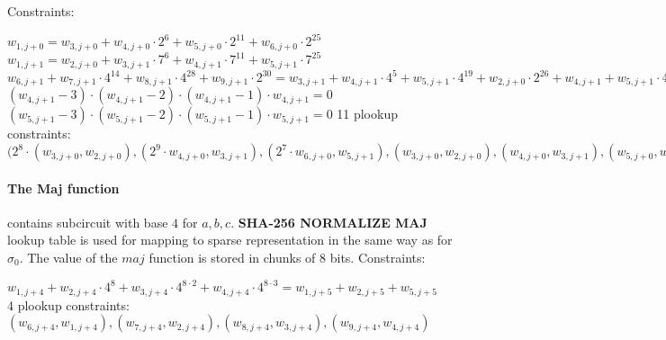 Constraints:
\begin{center}
    $w_{1, j + 0} = w_{3, j + 0} + w_{4, j + 0} \cdot 2^{6} + w_{5, j + 0} \cdot 2^{11} + w_{6, j + 0} \cdot 2^{25}$ \\
    $w_{1, j + 1} = w_{2, j + 0} + w_{3, j + 1} \cdot 7^{6} + w_{4, j + 1} \cdot 7^{11} + w_{5, j + 1} \cdot 7^{25}$ \\
    $w_{6, j + 1} + w_{7, j + 1} \cdot 4^{14} + w_{8, j + 1} \cdot 4^{28} + w_{9, j + 1} \cdot 2^{30} = w_{3, j + 1} + w_{4, j + 1} \cdot 4^{5} + w_{5, j + 1} \cdot 4^{19} + w_{2, j + 0} \cdot 2^{26} + w_{4, j + 1} + w_{5, j + 1} \cdot 4^{14} + w_{2, j + 0} \cdot 4^{21} + w_{3, j + 1} \cdot 4^{27} + w_{5, j + 1} + w_{2, j + 0} \cdot 4^{7}+ w_{3, j + 1} \cdot 4^{13} + w_{4, j + 1} \cdot 4^{27}$ \\
    $(w_{4, j + 1} - 3) \cdot (w_{4, j + 1} - 2) \cdot (w_{4, j + 1} - 1) \cdot w_{4, j + 1} = 0$
    $(w_{5, j + 1} - 3) \cdot (w_{5, j + 1} - 2) \cdot (w_{5, j + 1} - 1) \cdot w_{5, j + 1} = 0$
    11 plookup constraints: $(2^8 \cdot (w_{3, j + 0}, w_{2, j + 0}), (2^9 \cdot w_{4, j + 0}, w_{3, j + 1}), (2^7 \cdot w_{6, j + 0}, w_{5, j + 1}), (w_{3,j + 0}, w_{2,j+0}), (w_{4, j + 0}, w_{3, j + 1}), (w_{5, j + 0}, w_{4, j + 1}), (w_{6, j + 0}, w_{5, j + 1}), (w_{6, j + 2}, w_{6, j + 1}), (w_{7, j + 2}, w_{7, j + 1}), (w_{8, j + 2}, w_{7, j + 1}), (w_{9, j + 2}, w_{8, j + 1})$ \\
\end{center}

\paragraph{The Maj function}
contains subcircuit with base $4$ for $a, b ,c$.
\textbf{SHA-256 NORMALIZE MAJ} lookup table is used for mapping to sparse representation in the same way as for $\sigma_0$.
The value of the $ maj $ function is stored in chunks of $8$ bits.
Constraints:
\begin{center}
    $w_{1, j + 4} + w_{2, j + 4} \cdot 4^8 + w_{3, j + 4} \cdot 4^{8 \cdot 2} + w_{4, j + 4} \cdot 4^{8 \cdot 3} = w_{1, j + 5} + w_{2, j + 5} + w_{5, j + 5} $ \\
    4 plookup constraints: $( w_{6, j + 4}, w_{1, j + 4}), ( w_{7, j + 4}, w_{2, j + 4}), (w_{8, j + 4}, w_{3, j + 4}), (w_{9, j + 4}, w_{4, j + 4})$ \\
\end{center}

